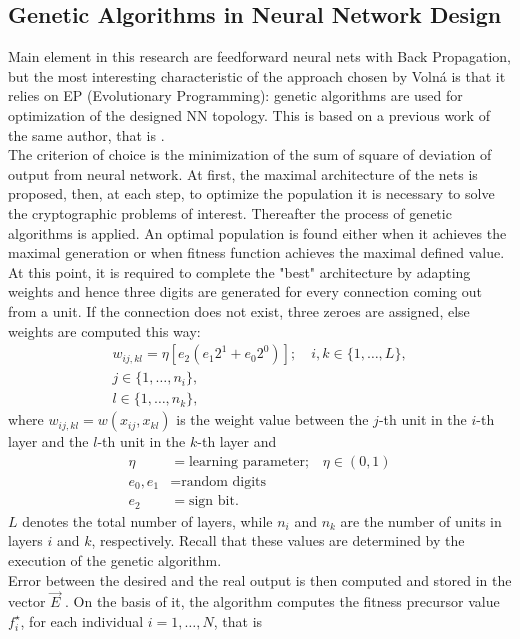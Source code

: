 \documentclass[%
    corpo=11pt,
    twoside,
    stile=classica,
    oldstyle,
    autoretitolo,
    tipotesi=magistrale,
    greek,
    evenboxes,
    english
]{toptesi}
\begin{document}
\subsection{Genetic Algorithms in Neural Network Design}
Main element in this research are feedforward neural nets with Back Propagation, but the most interesting characteristic of the approach chosen by Volná is that it relies on EP (Evolutionary Programming): genetic algorithms are used for optimization of the designed NN topology. This is based on a previous work of the same author, that is \cite{volna2}. \\
The criterion of choice is the minimization of the sum of square of deviation of output from neural network. At first, the maximal architecture of the nets is proposed, then, at each step, to optimize the population it is necessary to solve the cryptographic problems of interest. Thereafter the process of genetic algorithms is applied. An optimal population is found either when it achieves the maximal generation or when fitness function achieves the maximal defined value. \\
At this point, it is required to complete the "best" architecture by adapting weights and hence three digits are generated for every
connection coming out from a unit. If the connection does not exist, three zeroes are assigned, else weights are computed this way:
\begin{align}
w_{ij,kl} = \eta[e_2(e_1 2^1 + e_0 2^0)]; \quad i,k\in\{1,\dots,L\}, \\
  j\in\{1,\dots, n_i\}, \nonumber \\
  l \in\{1, \dots, n_k\}, \nonumber 
\end{align}
where $w_{ij,kl} = w(x_{ij}, x_{kl})$ is the weight value between the $j$-th unit in the $i$-th layer and the $l$-th unit in the $k$-th layer and
\begin{align*}
    \eta &= \text{learning parameter;} \quad \eta \in (0,1)\\
    e_0, e_1 &= \text{random digits} \\
  	e_2 &= \text{sign bit}.
\end{align*}
$L$ denotes the total number of layers, while $n_i$ and $n_k$ are the number of units in layers $i$ and $k$, respectively. Recall that these values are determined by the execution of the genetic algorithm. \\
Error between the desired and the real output is then computed and stored in the vector $\vec{E}$ . On the basis of it, the algorithm computes the fitness precursor value $f_i^{\star}$, for each individual $i = 1, \dots, N$, that is
\end{document}
